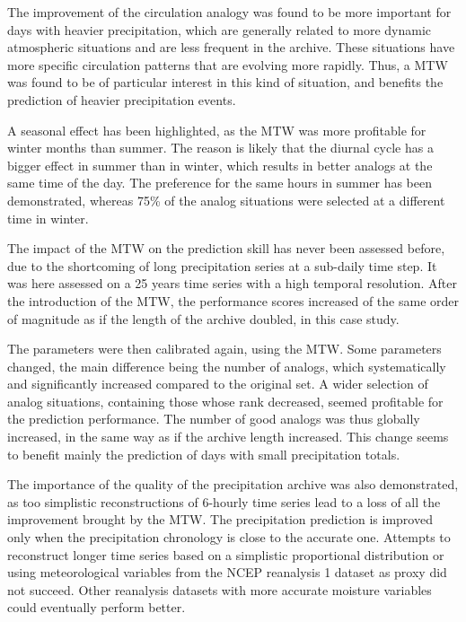 \documentclass[hess, manuscript]{copernicus}
\begin{document}
The improvement of the circulation analogy was found to be more important for days with heavier precipitation, which are generally related to more dynamic atmospheric situations and are less frequent in the archive. These situations have more specific circulation patterns that are evolving more rapidly. Thus, a MTW was found to be of particular interest in this kind of situation, and benefits the prediction of heavier precipitation events.

A seasonal effect has been highlighted, as the MTW was more profitable for winter months than summer. The reason is likely that the diurnal cycle has a bigger effect in summer than in winter, which results in better analogs at the same time of the day. The preference for the same hours in summer has been demonstrated, whereas 75\% of the analog situations were selected at a different time in winter.

The impact of the MTW on the prediction skill has never been assessed before, due to the shortcoming of long precipitation series at a sub-daily time step. It was here assessed on a 25 years time series with a high temporal resolution. After the introduction of the MTW, the performance scores increased of the same order of magnitude as if the length of the archive doubled, in this case study.

The parameters were then calibrated again, using the MTW. Some parameters changed, the main difference being the number of analogs, which systematically and significantly increased compared to the original set. A wider selection of analog situations, containing those whose rank decreased, seemed profitable for the prediction performance. The number of good analogs was thus globally increased, in the same way as if the archive length increased. This change seems to benefit mainly the prediction of days with small precipitation totals.

The importance of the quality of the precipitation archive was also demonstrated, as too simplistic reconstructions of 6-hourly time series lead to a loss of all the improvement brought by the MTW. The precipitation prediction is improved only when the precipitation chronology is close to the accurate one. Attempts to reconstruct longer time series based on a simplistic proportional distribution or using meteorological variables from the NCEP reanalysis 1 dataset as proxy did not succeed. Other reanalysis datasets with more accurate moisture variables could eventually perform better.
\end{document}
